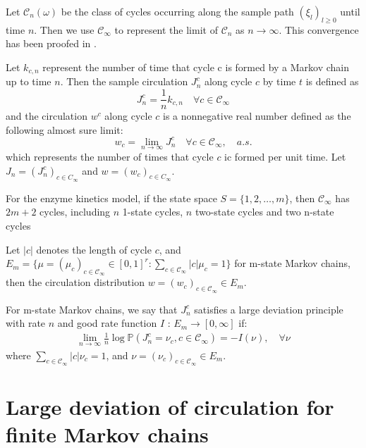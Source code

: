 \documentclass[11pt,en,cite=authoryear]{elegantpaper}
\begin{document}
\begin{definition}
    Let $\mathcal{C}_n(\omega)$ be the class of cycles occurring along the sample path $(\xi_l)_{l\ge 0}$ until time $n$. Then we use $\mathcal{C}_{\infty}$ to represent the limit of $\mathcal{C}_n$ as $n \rightarrow \infty$. This convergence has been proofed in \cite{jiang2004mathematical}.
\end{definition}

\begin{definition} %
    Let $k_{c, n}$ represent the number of time that cycle c is formed by a Markov chain up to time $n$. Then the sample circulation $J_{n}^c$ along cycle $c$ by time $t$ is defined as
    $$
    J_{n}^c = \frac{1}{n} k_{c, n} \quad \forall c \in \mathcal{C}_{\infty}
    $$
    and the circulation $w^c$ along cycle $c$ is a nonnegative real number defined as the following almost sure limit:
    $$
    w_c = \lim_{n \rightarrow \infty} J_{n}^c \quad \forall c \in \mathcal{C}_{\infty}, \quad a.s.
    $$
    which represents the number of times that cycle $c$ ic formed per unit time. Let $J_n = (J_n^c)_{c \in C_{\infty}}$ and $w =  (w_c)_{c \in C_{\infty}}$.
\end{definition}

For the enzyme kinetics model, if the state space $S=\{1, 2, \dots, m\}$, then $\mathcal{C}_{\infty}$ has $2m+2$ cycles, including $n$ 1-state cycles, $n$ two-state cycles and two n-state cycles

Let $|c|$ denotes the length of cycle $c$, and 
$E_m = \{\mu=(\mu_c)_{c\in \mathcal{C}_{\infty}} \in [0, 1]^r :\sum_{c \in \mathcal{C}_{\infty}} |c| \mu_c  = 1\}$ for m-state Markov chains, then the circulation distribution $w = (w_{c})_{c \in \mathcal{C}_{\infty}} \in E_m$.

\begin{definition}
    For m-state Markov chains, we say that $J_{n}^c$ satisfies a large deviation principle with rate $n$ and good rate function $I$ : $E_m \rightarrow [0, \infty]$ if:
    \begin{align}
        \lim_{n \rightarrow \infty} \frac{1}{n} \log \mathbb{P}(J_{n}^c = \nu_c , c \in \mathcal{C}_{\infty}) = - I(\nu), \quad \forall \nu
    \end{align}
    where $\sum_{c \in \mathcal{C}_{\infty}} |c| \nu_c = 1$, 
    and $\nu = (\nu_c)_{c \in \mathcal{C}_{\infty}} \in E_m$.
\end{definition}

\section{Large deviation of circulation for finite Markov chains}
\end{document}
